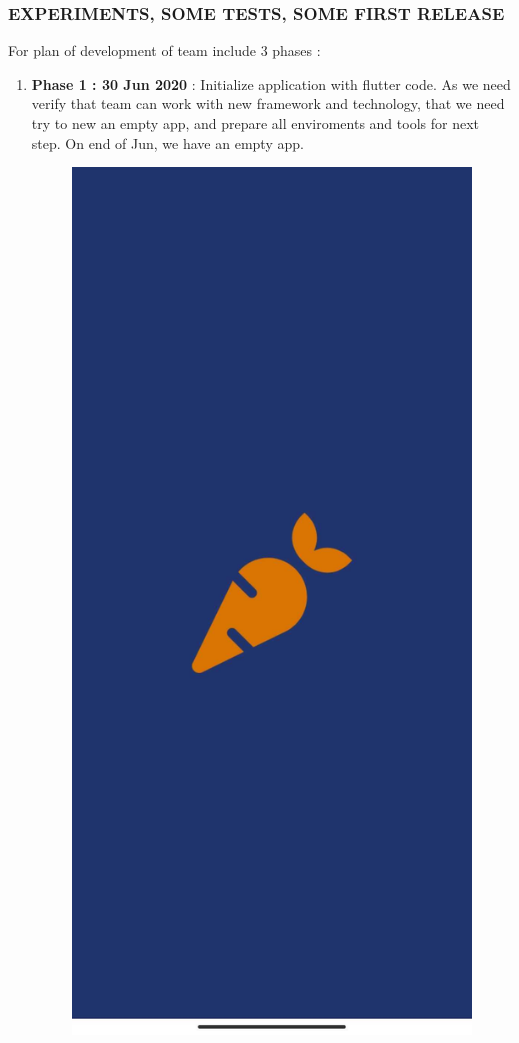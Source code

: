 \documentclass{article}
\begin{document}
    \subsubsection{EXPERIMENTS, SOME TESTS, SOME FIRST RELEASE} 
    For plan of development of team include 3 phases :   
    \begin{enumerate}
        \item \textbf{Phase 1 : 30 Jun 2020} : Initialize application with flutter code. As we need verify that team can work with new framework and technology, that we need try to new an empty app, and prepare all enviroments and tools for next step. On end of Jun, we have an empty app. \\
        \begin{figure}[h!]
            \centering
            \includegraphics[scale=0.17]{Images/flashcreen.jpg}

\end{figure}
\end{enumerate}
\end{document}
